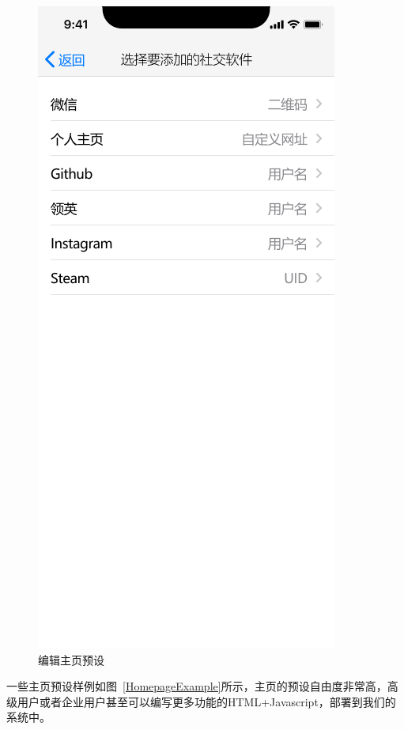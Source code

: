 \documentclass[UTF8]{ctexart}
\begin{document}
\begin{figure}[htbp]
{\begin{minipage}[b]{.3\linewidth}
            \includegraphics[scale=0.3]{ChooseSocialAPP.png}
        \end{minipage}
    }
    \caption{编辑主页预设}
    \label{EditHomepage}
\end{figure}

一些主页预设样例如图~\ref{HomepageExample}所示，主页的预设自由度非常高，高级用户或者企业用户甚至可以编写更多功能的HTML+Javascript，部署到我们的系统中。
\end{document}
